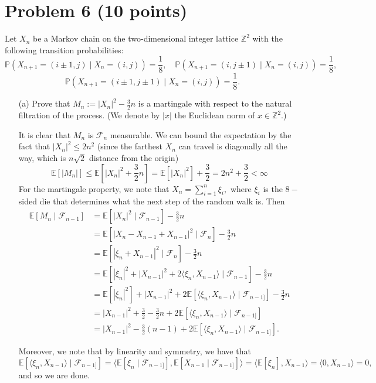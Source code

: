 \documentclass[11pt]{article}
\newcommand{\bbE}{\mathbb{E}}
\begin{document}
\newpage

\section*{Problem 6 (10 points)}
Let \(X_n\) be a Markov chain on the two-dimensional integer lattice \(\mathbb{Z}^2\) with the following transition probabilities:
\[
\mathbb{P}(X_{n+1} = (i \pm 1, j) \mid X_n = (i, j)) = \frac{1}{8}, \quad
\mathbb{P}(X_{n+1} = (i, j \pm 1) \mid X_n = (i, j)) = \frac{1}{8},
\]
\[
\mathbb{P}(X_{n+1} = (i \pm 1, j \pm 1) \mid X_n = (i, j)) = \frac{1}{8}.
\]

\begin{itemize}
    \item[(a)] Prove that \(M_n := |X_n|^2 - \frac{3}{2}n\) is a martingale with respect to the natural filtration of the process. (We denote by \(|x|\) the Euclidean norm of \(x \in \mathbb{Z}^2\).)
    \begin{solution}
It is clear that $M_n$ is $\mathcal{F}_n$ measurable. We can bound the expectation by the fact that $|X_n|^2 \leq 2n^2$ (since the farthest $X_n$ can travel is diagonally all the way, which is $n\sqrt{2}$ distance from the origin)
\[\bbE[|M_n|] \leq  \bbE[|X_n|^2 + \frac{3}{2}n] = \bbE[|X_n|^2] + \frac{3}{2} = 2n^2 + \frac{3}{2} <\infty\] For the martingale property, we note that $X_n = \sum_{i=1}^n \xi_i,$ where $\xi_i$ is the $8-$sided die that determines what the next step of the random walk is. Then 
\begin{align*}
    \bbE[M_n \mid \mathcal{F}_{n-1}] &= \bbE[|X_n|^2 \mid \mathcal{F}_{n-1}] - \frac{3}{2}n\\
    &= \bbE[|X_n - X_{n-1} + X_{n-1}|^2 \mid \mathcal{F}_n] - \frac{3}{2}n\\
    &= \bbE[|\xi_n + X_{n-1}|^2\mid \mathcal{F}_n] - \frac{3}{2}n\\
    &= \bbE[|\xi_n|^2 + |X_{n-1}|^2 + 2\langle\xi_n, X_{n-1}\rangle \mid \mathcal{F}_{n-1}] - \frac{3}{2}n\\
     &= \bbE[|\xi_n|^2] + |X_{n-1}|^2 + 2\bbE[\langle \xi_n, X_{n-1}\rangle \mid \mathcal{F}_{n-1]}]- \frac{3}{2}n\\
     &= |X_{n-1}|^2 + \frac{3}{2} - \frac{3}{2}n + 2\bbE[\langle \xi_n, X_{n-1}\rangle\mid \mathcal{F}_{n-1]}]\\
     &= |X_{n-1}|^2 - \frac{3}{2}(n-1) + 2\bbE[\langle \xi_n, X_{n-1}\rangle \mid \mathcal{F}_{n-1]}].
\end{align*}

Moreover, we note that by linearity and symmetry, we have that 
\[\bbE[\langle \xi_n, X_{n-1} \rangle  \mid \mathcal{F}_{n-1]}]= \langle \bbE[\xi_n\mid \mathcal{F}_{n-1]}], \bbE[X_{n-1}\mid \mathcal{F}_{n-1]}]\rangle = \langle \bbE[\xi_n], X_{n-1}\rangle = \langle 0, X_{n-1}\rangle = 0,\]and so we are done.
    \end{solution}



\end{itemize}
\end{document}

